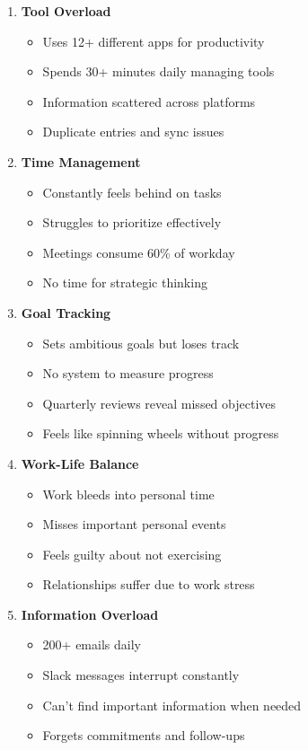 \begin{enumerate}
    \item \textbf{Tool Overload}
    \begin{itemize}
        \item Uses 12+ different apps for productivity
        \item Spends 30+ minutes daily managing tools
        \item Information scattered across platforms
        \item Duplicate entries and sync issues
    \end{itemize}
    
    \item \textbf{Time Management}
    \begin{itemize}
        \item Constantly feels behind on tasks
        \item Struggles to prioritize effectively
        \item Meetings consume 60\% of workday
        \item No time for strategic thinking
    \end{itemize}
    
    \item \textbf{Goal Tracking}
    \begin{itemize}
        \item Sets ambitious goals but loses track
        \item No system to measure progress
        \item Quarterly reviews reveal missed objectives
        \item Feels like spinning wheels without progress
    \end{itemize}
    
    \item \textbf{Work-Life Balance}
    \begin{itemize}
        \item Work bleeds into personal time
        \item Misses important personal events
        \item Feels guilty about not exercising
        \item Relationships suffer due to work stress
    \end{itemize}
    
    \item \textbf{Information Overload}
    \begin{itemize}
        \item 200+ emails daily
        \item Slack messages interrupt constantly
        \item Can't find important information when needed
        \item Forgets commitments and follow-ups
    \end{itemize}
\end{enumerate}

